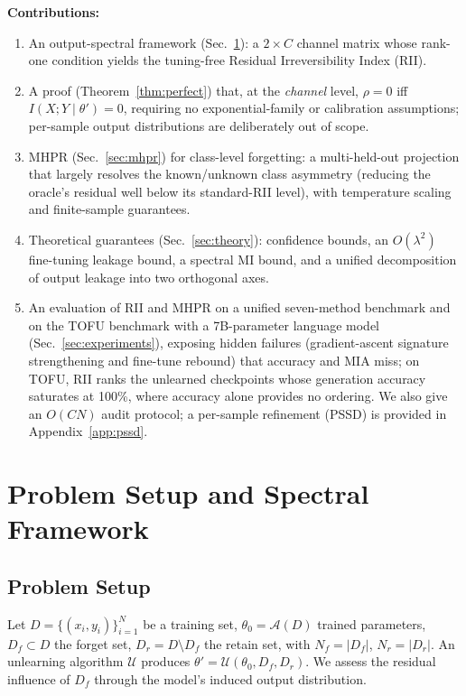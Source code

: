 \documentclass[smallextended]{svjour3}       %
\begin{document}
\textbf{Contributions:}
\begin{enumerate}
\item An output-spectral framework (Sec.~\ref{sec:channel}): a $2\times C$ channel matrix whose rank-one condition yields the tuning-free Residual Irreversibility Index (RII).
\item A proof (Theorem~\ref{thm:perfect}) that, at the \emph{channel} level, $\rho=0$ iff $I(X;Y\mid\theta')=0$, requiring no exponential-family or calibration assumptions; per-sample output distributions are deliberately out of scope.
\item MHPR (Sec.~\ref{sec:mhpr}) for class-level forgetting: a multi-held-out projection that largely resolves the known/unknown class asymmetry (reducing the oracle's residual well below its standard-RII level), with temperature scaling and finite-sample guarantees.
\item Theoretical guarantees (Sec.~\ref{sec:theory}): confidence bounds, an $O(\lambda^2)$ fine-tuning leakage bound, a spectral MI bound, and a unified decomposition of output leakage into two orthogonal axes.
\item An evaluation of RII and MHPR on a unified seven-method benchmark and on the TOFU benchmark with a 7B-parameter language model (Sec.~\ref{sec:experiments}), exposing hidden failures (gradient-ascent signature strengthening and fine-tune rebound) that accuracy and MIA miss; on TOFU, RII ranks the unlearned checkpoints whose generation accuracy saturates at 100\%, where accuracy alone provides no ordering. We also give an $O(CN)$ audit protocol; a per-sample refinement (PSSD) is provided in Appendix~\ref{app:pssd}.
\end{enumerate}

\section{Problem Setup and Spectral Framework}
\label{sec:channel}

\subsection{Problem Setup}

Let $D = \{(x_i, y_i)\}_{i=1}^N$ be a training set, $\theta_0 = \mathcal{A}(D)$ trained parameters, $D_f \subset D$ the forget set, $D_r = D \setminus D_f$ the retain set, with $N_f = |D_f|$, $N_r = |D_r|$. An unlearning algorithm $\mathcal{U}$ produces $\theta' = \mathcal{U}(\theta_0, D_f, D_r)$. We assess the residual influence of $D_f$ through the model's induced output distribution.
\end{document}
